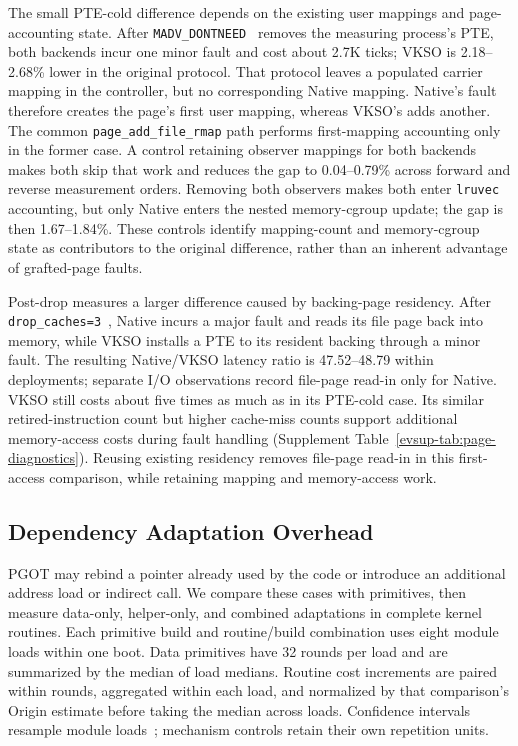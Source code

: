 The small PTE-cold difference depends on the existing user mappings and
page-accounting state. After \texttt{MADV\_DONTNEED}~\cite{ev_madvise}
removes the measuring process's PTE, both backends incur one minor fault
and cost about 2.7K ticks; VKSO is 2.18--2.68\% lower in the original
protocol. That protocol leaves a populated carrier mapping in the
controller, but no corresponding Native mapping. Native's fault therefore
creates the page's first user mapping, whereas VKSO's adds another.
The common \texttt{page\_add\_file\_rmap} path performs first-mapping
accounting only in the former case. A control retaining observer mappings
for both backends makes both skip that work and reduces the gap to
0.04--0.79\% across forward and reverse measurement orders. Removing
both observers makes both enter \texttt{lruvec} accounting, but only
Native enters the nested memory-cgroup update; the gap is then
1.67--1.84\%. These controls identify mapping-count and memory-cgroup
state as contributors to the original difference, rather than an
inherent advantage of grafted-page faults.

Post-drop measures a larger difference caused by backing-page residency.
After \texttt{drop\_caches=3}~\cite{ev_linuxvm515}, Native incurs a major
fault and reads its file page back into memory, while VKSO installs a
PTE to its resident backing through a minor fault. The resulting
Native/VKSO latency ratio is 47.52--48.79 within deployments; separate
I/O observations record file-page read-in only for Native. VKSO still
costs about five times as much as in its PTE-cold case. Its similar
retired-instruction count but higher cache-miss counts support additional
memory-access costs during fault handling
(Supplement Table~\ref{evsup-tab:page-diagnostics}). Reusing existing
residency removes file-page read-in in this first-access comparison,
while retaining mapping and memory-access work.

\subsection{Dependency Adaptation Overhead}
\label{sec:dependency-overhead}

PGOT may rebind a pointer already used by the code or introduce an
additional address load or indirect call. We compare these cases with
primitives, then measure data-only, helper-only, and combined adaptations
in complete kernel routines. Each primitive build and routine/build
combination uses eight module loads within one boot. Data primitives
have 32 rounds per load and are summarized by the median of load
medians. Routine cost increments are paired within rounds, aggregated
within each load, and normalized by that comparison's Origin estimate
before taking the median across loads. Confidence intervals resample
module loads~\cite{ev_efron1979}; mechanism controls retain their own
repetition units.


